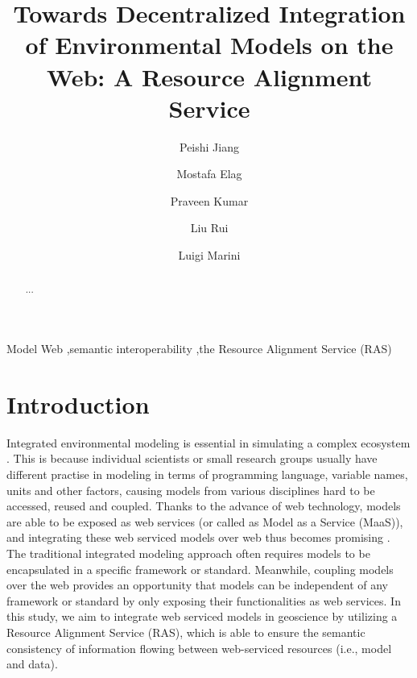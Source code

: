 \documentclass[review]{elsarticle}
\begin{document}
\begin{frontmatter}

\title{Towards Decentralized Integration of Environmental Models on the Web: A Resource Alignment Service}

\author[address1]{Peishi Jiang}
\author[address1]{Mostafa Elag}
\author[address1]{Praveen Kumar}
\author[address2]{Liu Rui}
\author[address2]{Luigi Marini}

\address[address1]{Ven Te Chow, Hydrosystem Laboratory, Civil and Environmental Engineering, University of Illinois, Urbana, IL, USA}
\address[address2]{National Center for Supercomputing Applications, University of Illinois, Urbana, IL, USA}

\begin{abstract}
...
\end{abstract}

\begin{keyword}
Model Web \sep semantic interoperability \sep the Resource Alignment Service (RAS) 
\end{keyword}

\end{frontmatter}

\linenumbers

\section{Introduction}Integrated environmental modeling is essential in simulating a complex ecosystem \citep{argent2004}. This is because individual scientists or small research groups usually have different practise in modeling in terms of programming language, variable names, units and other factors, causing models from various disciplines hard to be accessed, reused and coupled. Thanks to the advance of web technology, models are able to be exposed as web services (or called as Model as a Service (MaaS)), and integrating these web serviced models over web thus becomes promising \citep{goodall2011}. The traditional integrated modeling approach often requires models to be encapsulated in a specific framework or standard. Meanwhile, coupling models over the web provides an opportunity that models can be independent of any framework or standard by only exposing their functionalities as web services. In this study, we aim to integrate web serviced models in geoscience by utilizing a Resource Alignment Service (RAS), which is able to ensure the semantic consistency of information flowing between web-serviced resources (i.e., model and data).
\end{document}
